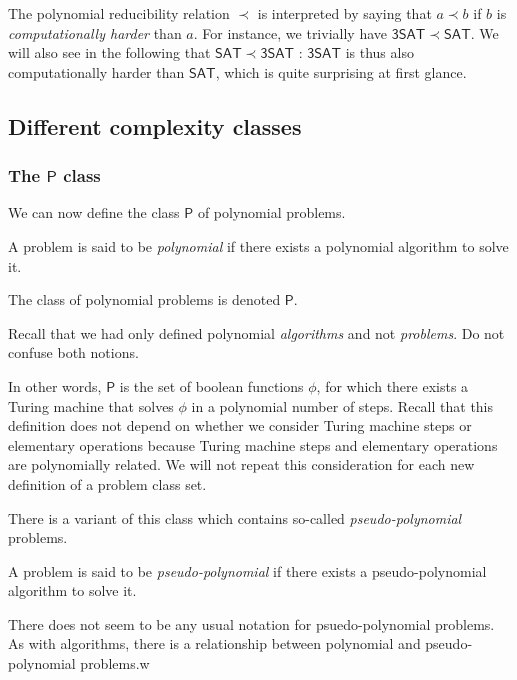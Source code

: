 The polynomial reducibility relation $ \prec $ is interpreted by saying that $ a \prec b $ if $ b $ is \textit{computationally harder} than $ a $. For instance, we trivially have $ \mathsf{3SAT} \prec \mathsf{SAT} $. We will also see in the following that $ \mathsf{SAT} \prec \mathsf{3SAT} $ : $ \mathsf{3SAT} $ is thus also computationally harder than $ \mathsf{SAT} $, which is quite surprising at first glance.

\subsection{Different complexity classes}

\subsubsection{The $ \mathsf P $ class}

We can now define the class $ \mathsf P $ of polynomial problems.

\begin{definition}
    A problem is said to be \textit{polynomial} if there exists a polynomial algorithm to solve it.

    The class of polynomial problems is denoted $ \mathsf P $.
\end{definition}

Recall that we had only defined polynomial \textit{algorithms} and not \textit{problems}. Do not confuse both notions.

In other words, $ \mathsf P $ is the set of boolean functions $ \phi $, for which there exists a Turing machine that solves $ \phi $ in a polynomial number of steps. Recall that this definition does not depend on whether we consider Turing machine steps or elementary operations because Turing machine steps and elementary operations are polynomially related. We will not repeat this consideration for each new definition of a problem class set.

There is a variant of this class which contains so-called \textit{pseudo-polynomial} problems.

\begin{definition}
    A problem is said to be \textit{pseudo-polynomial} if there exists a pseudo-polynomial algorithm to solve it.
\end{definition}

There does not seem to be any usual notation for psuedo-polynomial problems. As with algorithms, there is a relationship between polynomial and pseudo-polynomial problems.w


